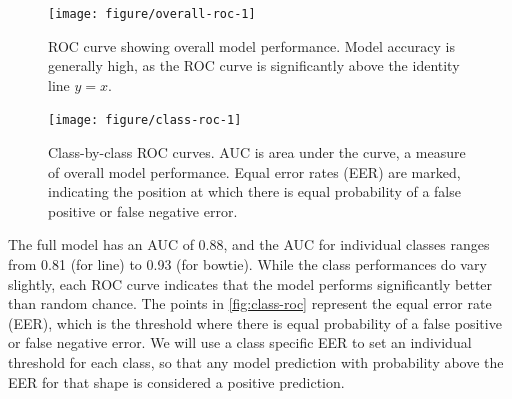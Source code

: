 \documentclass{article}\usepackage[]{graphicx}\usepackage[table]{xcolor}
\newenvironment{knitrout}{}{} %
\begin{document}
\begin{knitrout}
\color{fgcolor}\begin{figure}

{\centering \texttt{[image: figure/overall-roc-1]} 

}

\caption[Overall model performance ROC curve.]{ROC curve showing overall model performance. Model accuracy is generally high, as the ROC curve is significantly above the identity line $y=x$.}\label{fig:overall-roc}
\end{figure}


\end{knitrout}

\begin{knitrout}
\color{fgcolor}\begin{figure}

{\centering \texttt{[image: figure/class-roc-1]} 

}

\caption[Class-by-class ROC curves.]{Class-by-class ROC curves. AUC is area under the curve, a measure of overall model performance. Equal error rates (EER) are marked, indicating the position at which there is equal probability of a false positive or false negative error.}\label{fig:class-roc}
\end{figure}


\end{knitrout}

The full model has an AUC of 0.88, and the AUC for individual classes ranges from 0.81 (for line) to 0.93  (for bowtie).
While the class performances do vary slightly, each ROC curve indicates that the model performs significantly better than random chance. The points in \autoref{fig:class-roc} represent the equal error rate (EER), which is the threshold where there is equal probability of a false positive or false negative error. We will use a class specific EER to set an individual threshold for each class, so that any model prediction with probability above the EER for that shape is considered a positive prediction.
\end{document}

